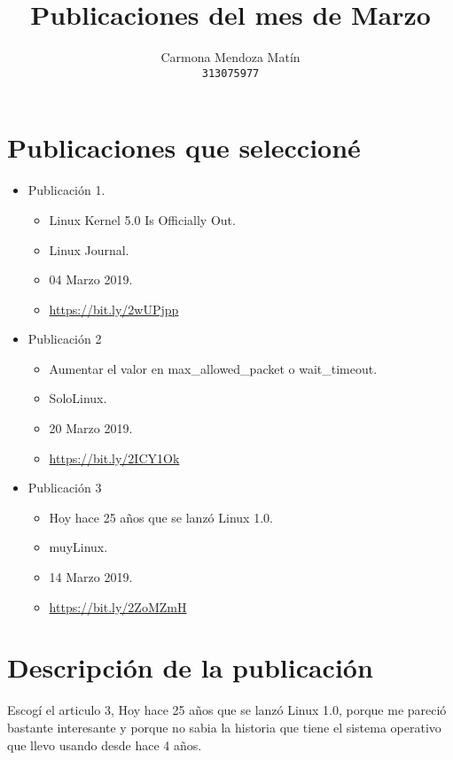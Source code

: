 \documentclass[11pt, a4paper]{report}
\begin{document}
\title{Publicaciones del mes de Marzo}
\author{
  Carmona Mendoza Mat\'in\\
  \texttt{313075977}
}
\date{}
\maketitle

\section*{Publicaciones que seleccioné}
\begin{itemize}

\item Publicación 1.
  \begin{itemize}
  \item Linux Kernel 5.0 Is Officially Out.
  \item Linux Journal.
  \item 04 Marzo 2019.
  \item \url{https://bit.ly/2wUPjpp}
  \end{itemize}
  
\item Publicación 2
  \begin{itemize}
  \item Aumentar el valor en max\_allowed\_packet o wait\_timeout.
  \item SoloLinux.
  \item 20 Marzo 2019. 
  \item \url{https://bit.ly/2ICY1Ok}
  \end{itemize}

\item Publicación 3
  \begin{itemize}
  \item Hoy hace 25 años que se lanzó Linux 1.0.
  \item muyLinux.
  \item 14 Marzo 2019.
  \item \url{https://bit.ly/2ZoMZmH}
  \end{itemize}
\end{itemize}  

\section*{Descripción de la publicación}
Escogí el articulo 3, Hoy hace 25 años que se lanzó Linux 1.0, porque me pareció
bastante interesante y porque no sabia la historia que tiene el sistema
operativo que llevo usando desde hace 4 años. \\
\end{document}
